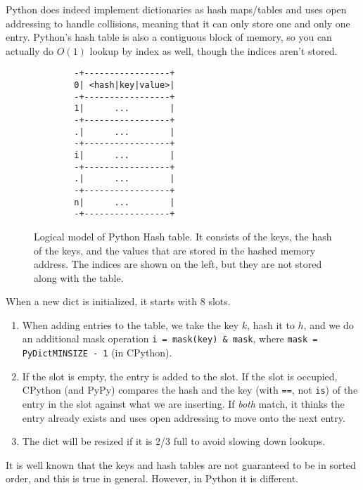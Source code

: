   \begin{definition}
    Python does indeed implement dictionaries as hash maps/tables and uses open addressing to handle collisions, meaning that it can only store one and only one entry. Python's hash table is also a contiguous block of memory, so you can actually do $O(1)$ lookup by index as well, though the indices aren't stored. 

    \begin{figure}[H]
      \centering 
      \begin{lstlisting}
        -+-----------------+
        0| <hash|key|value>|
        -+-----------------+
        1|      ...        |
        -+-----------------+
        .|      ...        |
        -+-----------------+
        i|      ...        |
        -+-----------------+
        .|      ...        |
        -+-----------------+
        n|      ...        |
        -+-----------------+ 
      \end{lstlisting}
      \caption{Logical model of Python Hash table. It consists of the keys, the hash of the keys, and the values that are stored in the hashed memory address. The indices are shown on the left, but they are not stored along with the table. }
      \label{fig:hash_table}
    \end{figure}

    When a new dict is initialized, it starts with 8 slots. 
    \begin{enumerate}
      \item When adding entries to the table, we take the key $k$, hash it to $h$, and we do an additional mask operation \texttt{i = mask(key) \& mask}, where \texttt{mask = PyDictMINSIZE - 1} (in CPython). 
      \item If the slot is empty, the entry is added to the slot. If the slot is occupied, CPython (and PyPy) compares the hash and the key (with \texttt{==}, not \texttt{is}) of the entry in the slot against what we are inserting. If \textit{both} match, it thinks the entry already exists and uses open addressing to move onto the next entry. 
      \item The dict will be resized if it is 2/3 full to avoid slowing down lookups. 
    \end{enumerate}
  \end{definition}

  It is well known that the keys and hash tables are not guaranteed to be in sorted order, and this is true in general. However, in Python it is different. 

